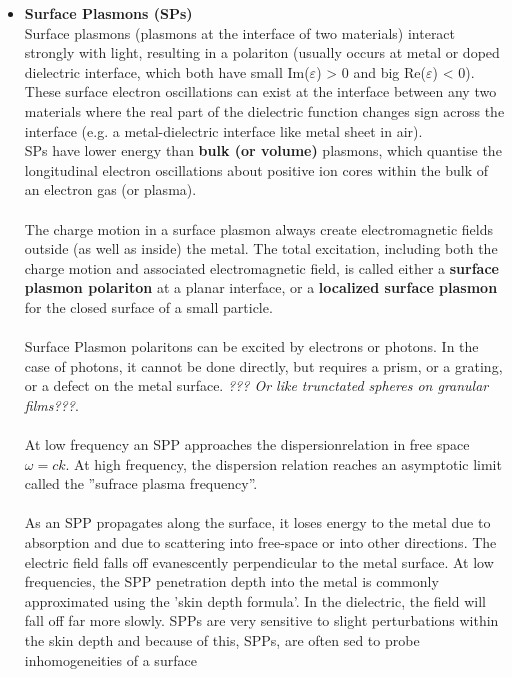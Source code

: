 \begin{itemize}
\item \textbf{Surface Plasmons (SPs)} \\
Surface plasmons (plasmons at the interface of two materials) interact strongly with light,
resulting in a polariton (usually occurs at metal or doped dielectric interface, 
which both have small Im($\varepsilon$) > 0 and big Re($\varepsilon$) < 0).
These surface electron oscillations can exist at the interface between
any two materials where the real part of the dielectric function changes sign across the interface
(e.g. a metal-dielectric interface like metal sheet in air).
\\
SPs have lower energy than \textbf{bulk (or volume)} plasmons, which quantise the longitudinal
electron oscillations about positive ion cores within the bulk of an electron gas (or plasma).
\\
\\
The charge motion in a surface plasmon always create electromagnetic fields outside (as well as inside)
the metal. The total excitation, including both the charge motion and associated electromagnetic field,
is called either a \textbf{surface plasmon polariton} at a planar interface, or a \textbf{localized
surface plasmon} for the closed surface of a small particle.
\\
\\
Surface Plasmon polaritons can be excited by electrons or photons. In the case of photons, it
cannot be done directly, but requires a prism, or a grating, or a defect on the metal surface.
\textit{??? Or like trunctated spheres on granular films???}.
\\
\\
At low frequency an SPP approaches the dispersionrelation in free space $\omega = ck$.
At high frequency, the dispersion relation reaches an asymptotic limit called the ''sufrace plasma frequency''.
\\
\\
As an SPP propagates along the surface, it loses energy to the metal
due to absorption and due to scattering into free-space or into other directions. The electric field
falls off evanescently perpendicular to the metal surface. At low frequencies, the SPP penetration depth into
the metal is commonly approximated using the 'skin depth formula'. In the dielectric, the field 
will fall off far more slowly. SPPs are very sensitive to slight perturbations within the skin depth and because of this, SPPs, are often sed to probe inhomogeneities of a surface
\\
\\

\end{itemize}
